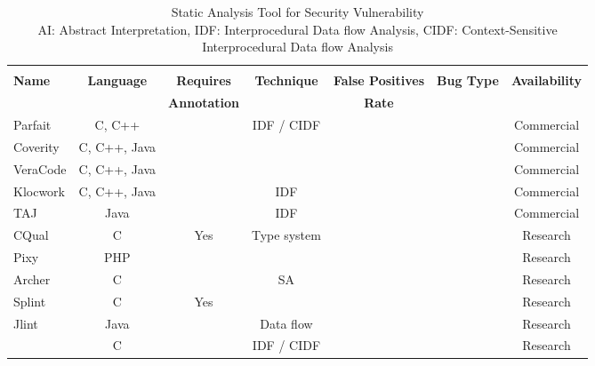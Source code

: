 \newcommand{\parfait}{\texttt{Parfait}\xspace}
\newcommand{\cqual}{\texttt{CQual}\xspace}
\newcommand{\dytan}{\texttt{Dytan}\xspace}
\newcommand{\pixy}{\texttt{Pixy}\xspace}
\newcommand{\ardilla}{\texttt{ARDILLA}\xspace}
\newcommand{\taintcheck}{\texttt{TaintCheck}\xspace}
\newcommand{\libsafe}{\texttt{Libsafe}\xspace}

\newcommand{\valgrind}{\texttt{Valgrind}\xspace}
\newcommand{\datalog}{\texttt{Datalog}\xspace}
\newcommand{\bddbddb}{\texttt{bddbddb}\xspace}
\newcommand{\pql}{\texttt{PQL}\xspace}

\begin{table*}[!htbp]
\centering
\begin{tabular}{|l|c|c|c|c|c|c|}
\hline
		 	& 				& 					& 					 	&	 				& 				 	& 					\\
{\bf Name}	& {\bf Language}& {\bf Requires }	& {\bf Technique }		&{\bf False Positives}& {\bf Bug Type}	& {\bf Availability}\\ 
 			& 				& {\bf Annotation}	&						&	{\bf Rate}		&					&					\\	\hline
	  																																	\hline
Parfait	    & C, C++		&					&	IDF / CIDF			&					&					&	Commercial		\\ 
Coverity	& C, C++, Java  &					&						&					&					&	Commercial		\\ 
VeraCode	& C, C++, Java  &					&						&					&					&	Commercial		\\ 
Klocwork	& C, C++, Java  &					&	IDF					&					&					&	Commercial		\\ 
TAJ			& Java  		&					&	IDF					&					&					&	Commercial		\\ 
CQual	 	& C 			&	Yes				&	Type system			&					&   				&	Research		\\ 
Pixy		& PHP			&					&						&					&					&	Research		\\ 
Archer	 	& C				&					&	SA					&					&   				&	Research		\\
Splint		& C 			&	Yes				&						&					&					&	Research		\\
Jlint		& Java			&					&	Data flow			&					&					&	Research		\\
\waint		& C				&					&	IDF	/ CIDF			&					&					&	Research		\\\hline
\end{tabular}\caption{Static Analysis Tool for Security Vulnerability\\
AI: Abstract Interpretation, 
IDF: Interprocedural Data flow Analysis, 
CIDF: Context-Sensitive Interprocedural Data flow Analysis }
\end{table*}

